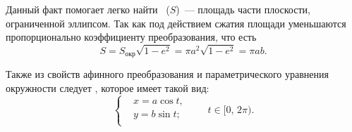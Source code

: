 Данный факт помогает легко найти ~($S$)~--- площадь части
плоскости, ограниченной эллипсом. Так как под действием сжатия площади уменьшаются пропорционально коэффициенту преобразования, что есть
\begin{equation}
    S = S_\text{окр} \sqrt{1 - e^2} = \pi a^2 \sqrt{1 - e^2} = \pi a b.
\end{equation}

Также из свойств афинного преобразования и параметрического уравнения окружности следует , которое имеет такой вид:
\begin{equation}
    \left\{
    \begin{aligned}
        &x=a\cos t,\\
        &y=b\sin t;\\
    \end{aligned}
    \right. \quad\quad t \in [0, \, 2\pi).
\end{equation}

